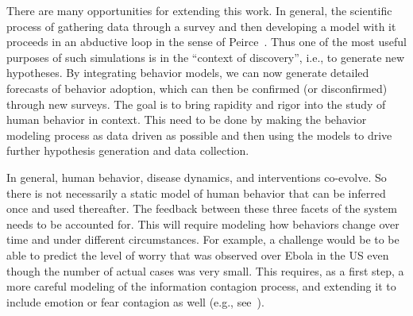 \documentclass[doublespace,draft]{VTthesis}
\begin{document}
    There are many opportunities for extending this work. In general, the scientific process of gathering data through a survey and then developing a model with it proceeds in an abductive loop in the sense of Peirce~\cite{peirce57abduction}. Thus one of the most useful purposes of such simulations is in the ``context of discovery'', i.e., to generate new hypotheses. By integrating behavior models, we can now generate detailed forecasts of behavior adoption, which can then be confirmed (or disconfirmed) through new surveys. The goal is to bring rapidity and rigor into the study of human behavior in context. This need to be done by making the behavior modeling process as data driven as possible and then using the models to drive further hypothesis generation and data collection. 
    
    In general, human behavior, disease dynamics, and interventions co-evolve. So there is not necessarily a static model of human behavior that can be inferred once and used thereafter. The feedback between these three facets of the system needs to be accounted for. This will require modeling how behaviors change over time and under different circumstances. For example, a challenge would be to be able to predict the level of worry that was observed over Ebola in the US even though the number of actual cases was very small. This requires, as a first step, a more careful modeling of the information contagion process, and extending it to include emotion or fear contagion as well (e.g., see~\cite{epstein08coupled}).
	




\end{document}
